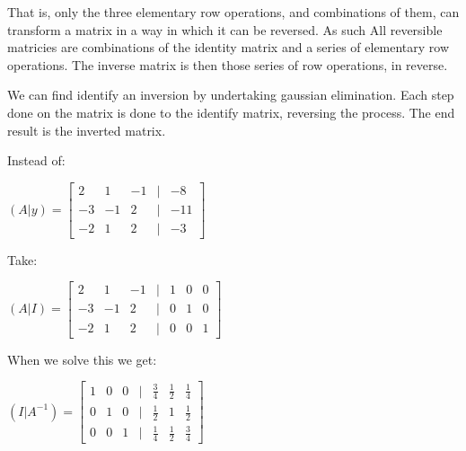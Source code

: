 That is, only the three elementary row operations, and combinations of them, can transform a matrix in a way in which it can be reversed. As such All reversible matricies are combinations of the identity matrix and a series of elementary row operations. The inverse matrix is then those series of row operations, in reverse.

We can find identify an inversion by undertaking gaussian elimination. Each step done on the matrix is done to the identify matrix, reversing the process. The end result is the inverted matrix.

Instead of:

\((A|y)=\begin{bmatrix}2 & 1&-1&|&-8\\-3 & -1&2&|&-11\\-2&1&2&|&-3\end{bmatrix}\)

Take:

\((A|I)=\begin{bmatrix}2 & 1&-1&|&1&0&0\\-3 & -1&2&|&0&1&0\\-2&1&2&|&0&0&1\end{bmatrix}\)

When we solve this we get:

\((I|A^{-1})=\begin{bmatrix}1 & 0&0&|&\frac{3}{4}&\frac{1}{2}&\frac{1}{4}\\0& 1&0&|&\frac{1}{2}&1&\frac{1}{2}\\0&0&1&|&\frac{1}{4}&\frac{1}{2}&\frac{3}{4}\end{bmatrix}\)

